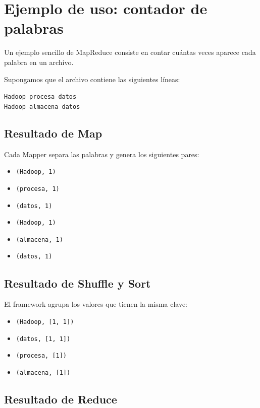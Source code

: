 \section{Ejemplo de uso: contador de palabras}

Un ejemplo sencillo de MapReduce consiste en contar cuántas veces aparece cada
palabra en un archivo.

Supongamos que el archivo contiene las siguientes líneas:

\begin{center}
\texttt{Hadoop procesa datos}\\
\texttt{Hadoop almacena datos}
\end{center}

\subsection*{Resultado de Map}

Cada Mapper separa las palabras y genera los siguientes pares:

\begin{itemize}
    \item \texttt{(Hadoop, 1)}
    \item \texttt{(procesa, 1)}
    \item \texttt{(datos, 1)}
    \item \texttt{(Hadoop, 1)}
    \item \texttt{(almacena, 1)}
    \item \texttt{(datos, 1)}
\end{itemize}

\subsection*{Resultado de Shuffle y Sort}

El framework agrupa los valores que tienen la misma clave:

\begin{itemize}
    \item \texttt{(Hadoop, [1, 1])}
    \item \texttt{(datos, [1, 1])}
    \item \texttt{(procesa, [1])}
    \item \texttt{(almacena, [1])}
\end{itemize}

\subsection*{Resultado de Reduce}

